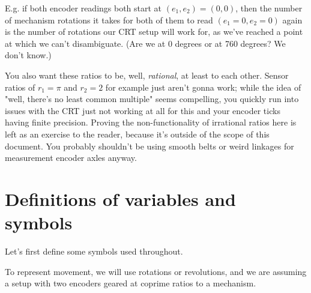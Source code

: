 \documentclass[11pt]{article}
\begin{document}
E.g. if both encoder readings both start at $(e_1, e_2) = (0, 0)$, then the number of mechanism rotations it takes for both of them to read $(e_1 = 0, e_2 = 0)$ again is the number of rotations our CRT setup will work for, as we've reached a point at which we can't disambiguate. (Are we at 0 degrees or at 760 degrees? We don't know.)

You also want these ratios to be, well, \textit{rational}, at least to each other.
Sensor ratios of $r_1 = \pi$ and $r_2 = 2$ for example just aren't gonna work; 
while the idea of "well, there's no least common multiple" seems compelling, you quickly run into issues with the CRT just not working at all for this and your encoder ticks having finite precision.
Proving the non-functionality of irrational ratios here is left as an exercise to the reader, because it's outside of the scope of this document.
You probably shouldn't be using smooth belts or weird linkages for measurement encoder axles anyway.

\section{Definitions of variables and symbols}

Let's first define some symbols used throughout.

To represent movement, we will use rotations or revolutions, and we are assuming a setup with two encoders geared at coprime ratios to a mechanism.
\end{document}
